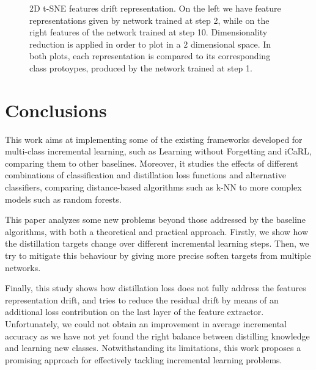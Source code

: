 \documentclass[10pt,twocolumn,letterpaper]{article}
\begin{document}
\begin{figure*}
\begin{center}
\begin{subfigure}{0.48\textwidth}
\end{subfigure}
\end{center}
\caption{2D t-SNE features drift representation. On the left we have feature representations given by network trained at step 2, while on the right features of the network trained at step 10. Dimensionality reduction is applied in order to plot in a 2 dimensional space. In both plots, each representation is compared to its corresponding class protoypes, produced by the network trained at step 1.}

\label{5:tsne}
\end{figure*}

\section{Conclusions}
This work aims at implementing some of the existing frameworks developed for multi-class incremental learning, such as Learning without Forgetting and iCaRL, comparing them to other baselines. Moreover, it studies the effects of different combinations of classification and distillation loss functions and alternative classifiers, comparing distance-based algorithms such as k-NN to more complex models such as random forests.

This paper analyzes some new problems beyond those addressed by the baseline algorithms, with both a theoretical and practical approach. Firstly, we show how the distillation targets change over different incremental learning steps. Then, we try to mitigate this behaviour by giving more precise soften targets from multiple networks.

Finally, this study shows how distillation loss does not fully address the features representation drift, and tries to reduce the residual drift by means of an additional loss contribution on the last layer of the feature extractor. Unfortunately, we could not obtain an improvement in average incremental accuracy as we have not yet found the right balance between distilling knowledge and learning new classes. Notwithstanding its limitations, this work proposes a promising approach for effectively tackling incremental learning problems.
\end{document}
